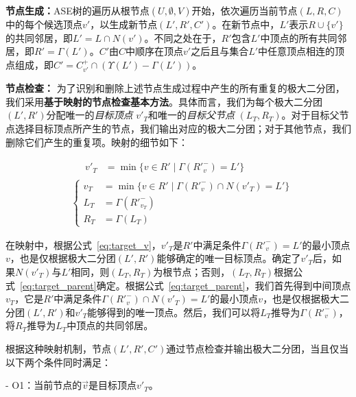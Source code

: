 
\textbf{节点生成：}ASE树的遍历从根节点$(U, \emptyset, V)$开始，依次遍历当前节点$(L, R, C)$中的每个候选顶点$v'$，以生成新节点$(L', R', C')$。在新节点中，$L'$表示$R\cup\{v'\}$的共同邻居，即$L' = L\cap N(v')$。不同之处在于，$R'$包含$L'$中顶点的所有共同邻居，即$R' = \Gamma(L')$。$C'$由$C$中顺序在顶点$v'$之后且与集合$L'$中任意顶点相连的顶点组成，即$C'= C_{v'}^+ \cap (\Upsilon(L') - \Gamma(L'))$。

\textbf{节点检查：} 为了识别和删除上述节点生成过程中产生的所有重复的极大二分团，我们采用\textbf{基于映射的节点检查基本方法}。具体而言，我们为每个极大二分团$(L', R')$分配唯一的\emph{目标顶点} $v'_T$和唯一的\emph{目标父节点} $(L_T, R_T)$。对于目标父节点选择目标顶点所产生的节点，我们输出对应的极大二分团；对于其他节点，我们删除它们产生的重复项。映射的细节如下：

\vspace{-0.5in}
\begin{align}
	\label{eq:target_v}
	& \begin{aligned}
		\hspace{13pt} v'_T &= \min\{v \in R' \mid \Gamma({R'}_{v}^-) = L' \}
	\end{aligned} \\
	\label{eq:target_parent}
	& \left\{
	\begin{aligned}
		v_T &= \min\{v \in R' \mid \Gamma({R'}_{v}^-) \cap N(v'_T) = L'\} \\
		L_T &= \Gamma({R'}_{v_T}^-) \\
		R_T &= \Gamma(L_T)
	\end{aligned}
	\right.
\end{align}


在映射中，根据公式~\ref{eq:target_v}，$v'_T$是$R'$中满足条件$\Gamma({R'}_{v}^-) = L'$的最小顶点$v$，也是仅根据极大二分团$(L', R')$能够确定的唯一目标顶点。确定了$v'_T$后，如果$N(v'_T)$与$L'$相同，则$(L_T, R_T)$为根节点；否则，$(L_T, R_T)$根据公式~\ref{eq:target_parent}确定。根据公式~\ref{eq:target_parent}，我们首先得到中间顶点$v_T$，它是$R'$中满足条件$\Gamma({R'}_{v}^-) \cap N(v'_T) = L'$的最小顶点$v$，也是仅根据极大二分团$(L', R')$和$v'_T$能够得到的唯一顶点。然后，我们可以将$L_T$推导为$\Gamma({R'}_{v}^-)$，将$R_T$推导为$L_T$中顶点的共同邻居。

根据这种映射机制，节点$(L', R', C')$通过节点检查并输出极大二分团，当且仅当以下两个条件同时满足：

- O1：当前节点的$\vec{v}$是目标顶点$v'_T$。

